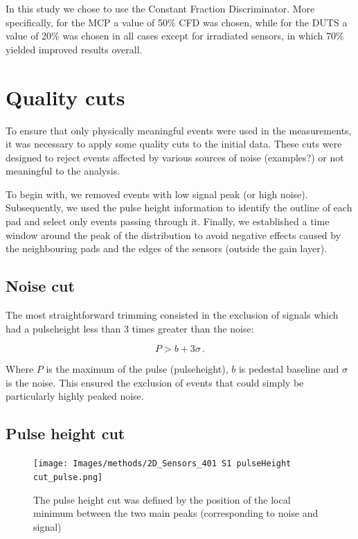 In this study we chose to use the Constant Fraction Discriminator. More specifically, for the MCP a value of 50\% CFD was chosen, while for the DUTS a value of 20\% was chosen in all cases except for irradiated sensors, in which 70\% yielded improved results overall.


\section{Quality cuts}\label{sec:qualtiy_cuts}

To ensure that only physically meaningful events were used in the measurements, it was necessary to apply some quality cuts to the initial data. These cuts were designed to reject events affected by various sources of noise (examples?) or not meaningful to the analysis. 

To begin with, we removed events with low signal peak (or high noise). Subsequently, we used the pulse height information to identify the outline of each pad and select only events passing through it. Finally, we established a time window around the peak of the distribution to avoid negative effects caused by the neighbouring pads and the edges of the sensors (outside the gain layer).

\subsection{Noise cut}\label{subsec:noise_cut}
The most straightforward trimming consisted in the exclusion of signals which had a pulseheight less than 3 times greater than the noise:

\begin{equation*}
    P > b + 3\sigma \, .
\end{equation*}

Where $P$ is the maximum of the pulse (pulseheight), $b$ is pedestal baseline and $\sigma$ is the noise. This ensured the exclusion of events that could simply be particularly highly peaked noise. %

\subsection{Pulse height cut}\label{subsec:pulseHeight_cut}

\begin{figure}[!ht]
    \centering
    \texttt{[image: Images/methods/2D\_Sensors\_401 S1 pulseHeight cut\_pulse.png]}
    \captionsetup{width=\captionwidth}
    \caption{The pulse height cut was defined by the position of the local minimum between the two main peaks (corresponding to noise and signal)}
    \label{fig:pulseHeight_cut}
\end{figure}

